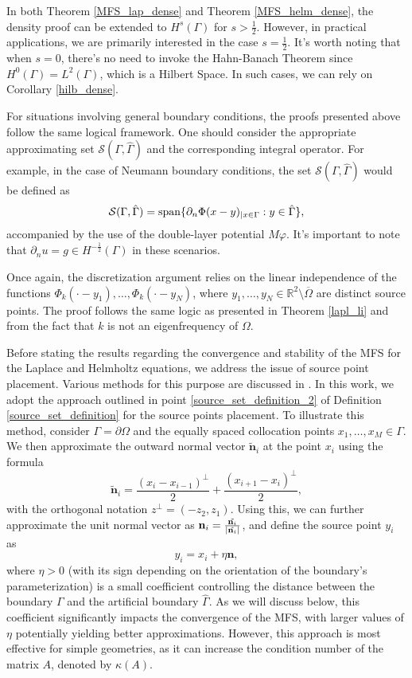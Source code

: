 \begin{remark}\label{density_remark_general_bc_and_hilbert}
    In both Theorem \ref{MFS_lap_dense} and Theorem \ref{MFS_helm_dense}, the density proof can be extended to \(H^s(\Gamma)\) for \(s > \frac{1}{2}\). However, in practical applications, we are primarily interested in the case \(s = \frac{1}{2}\). It's worth noting that when \(s = 0\), there's no need to invoke the Hahn-Banach Theorem since \(H^0(\Gamma) = L^2(\Gamma)\), which is a Hilbert Space. In such cases, we can rely on Corollary \ref{hilb_dense}.

    For situations involving general boundary conditions, the proofs presented above follow the same logical framework. One should consider the appropriate approximating set \(\mathcal{S}(\Gamma, \hat{\Gamma})\) and the corresponding integral operator. For example, in the case of Neumann boundary conditions, the set \(\mathcal{S}(\Gamma, \hat{\Gamma})\) would be defined as
    \[
    \mathcal{S}(\Gamma, \hat{\Gamma}) = \operatorname{span}\{\partial_n \Phi(x-y)_{|x \in \Gamma} : y \in \hat{\Gamma}\},
    \]
    accompanied by the use of the double-layer potential \(M\varphi\). It's important to note that \(\partial_n u = g \in H^{-\frac{1}{2}}(\Gamma)\) in these scenarios.
\end{remark}

Once again, the discretization argument relies on the linear independence of the functions \(\Phi_k(\cdot-y_1),\dots,\Phi_k(\cdot-y_N)\), where \(y_1,\dots,y_N \in \mathbb{R}^2\setminus\overline{\Omega}\) are distinct source points. The proof follows the same logic as presented in Theorem \ref{lapl_li} and from the fact that \(k\) is not an eigenfrequency of \(\Omega\).

Before stating the results regarding the convergence and stability of the \ac{MFS} for the Laplace and Helmholtz equations, we address the issue of source point placement. Various methods for this purpose are discussed in \cite{alves2009choice}. In this work, we adopt the approach outlined in point \ref{source_set_definition_2} of Definition \ref{source_set_definition} for the source points placement. To illustrate this method, consider \(\Gamma = \partial \Omega\) and the equally spaced collocation points \(x_1,\dots,x_M \in \Gamma\). We then approximate the outward normal vector \(\tilde{\mathbf{n}}_i\) at the point \(x_i\) using the formula
\[
    \tilde{\mathbf{n}}_i = \frac{(x_i - x_{i-1})^\perp }{2} + \frac{(x_{i+1}-x_i)^\perp }{2},
\]
with the orthogonal notation \(z^\perp = (-z_2,z_1)\). Using this, we can further approximate the unit normal vector as \(\mathbf{n}_i = \frac{\tilde{\mathbf{n}_i}}{\abs{\tilde{\mathbf{n}_i}}}\), and define the source point \(y_i\) as
\[
    y_i = x_i + \eta \mathbf{n},
\]
where \(\eta>0\) (with its sign depending on the orientation of the boundary's parameterization) is a small coefficient controlling the distance between the boundary \(\Gamma\) and the artificial boundary \(\hat{\Gamma}\). As we will discuss below, this coefficient significantly impacts the convergence of the \ac{MFS}, with larger values of \(\eta\) potentially yielding better approximations. However, this approach is most effective for simple geometries, as it can increase the condition number of the matrix \(A\), denoted by \(\kappa(A)\).


